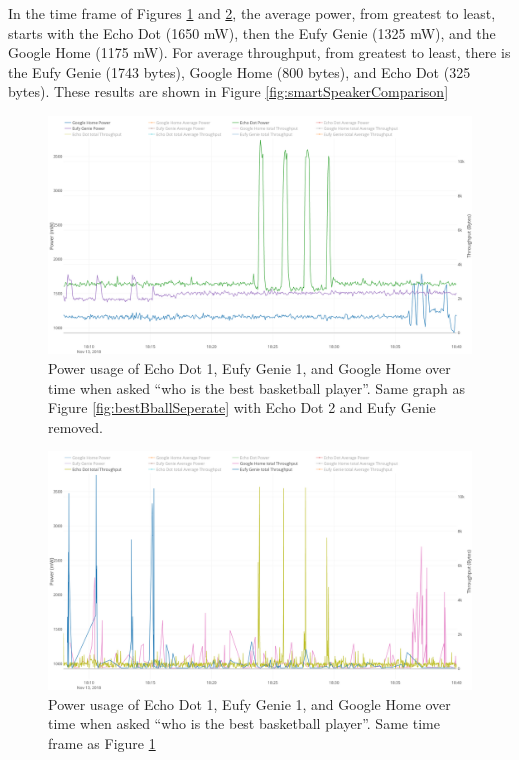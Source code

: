 In the time frame of Figures \ref{fig:smartSpeakerSeperate} and \ref{fig:smartSpeakerNetworkSeperate}, the average power, from greatest to least, starts with the Echo Dot (1650 mW), then the Eufy Genie (1325 mW), and the Google Home (1175 mW). For average throughput, from greatest to least, there is the Eufy Genie (1743 bytes), Google Home (800 bytes), and Echo Dot (325 bytes). These results are shown in Figure \ref{fig:smartSpeakerComparison}

\begin{figure}[H]
  \centering
  \includegraphics[width=1\textwidth]{figures/smartSpeakerSeperate.png}
  \caption{Power usage of Echo Dot 1, Eufy Genie 1, and Google Home over time when asked ``who is the best basketball player''. Same graph as Figure \ref{fig:bestBballSeperate} with Echo Dot 2 and Eufy Genie removed.}
  \label{fig:smartSpeakerSeperate}
\end{figure}

\begin{figure}[H]
  \centering
  \includegraphics[width=1\textwidth]{figures/smartSpeakerNetworkSeperate.png}
  \caption{Power usage of Echo Dot 1, Eufy Genie 1, and Google Home over time when asked ``who is the best basketball player''. Same time frame as Figure \ref{fig:smartSpeakerSeperate}}
  \label{fig:smartSpeakerNetworkSeperate}
\end{figure}

